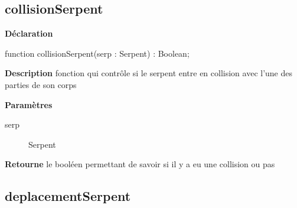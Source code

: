 \documentclass{report}
\newif\ifpdf
\begin{document}
\subsection*{collisionSerpent}
\fi
\label{Deplacement-collisionSerpent}
\begin{list}{}{
\setlength{\itemindent}{0cm}
\setlength{\listparindent}{0cm}
\setlength{\leftmargin}{\evensidemargin}
\addtolength{\leftmargin}{\tmplength}
\settowidth{\labelsep}{X}
\addtolength{\leftmargin}{\labelsep}
\setlength{\labelwidth}{\tmplength}
}
\item[\textbf{Déclaration}\hfill]
\ifpdf
\begin{flushleft}
\fi
\begin{ttfamily}
function collisionSerpent(serp : Serpent) : Boolean;\end{ttfamily}

\ifpdf
\end{flushleft}
\fi

\par
\item[\textbf{Description}]
fonction qui contrôle si le serpent entre en collision avec l'une des parties de son corps  \par
\item[\textbf{Paramètres}]
\begin{description}
\item[serp] Serpent
\end{description}
\item[\textbf{Retourne}]le booléen permettant de savoir si il y a eu une collision ou pas


\end{list}
\ifpdf
\subsection*{\large{\textbf{deplacementSerpent}}\normalsize\hspace{1ex}\hrulefill}
\else
\end{document}
